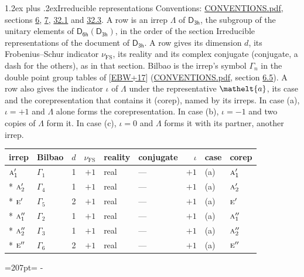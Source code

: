\documentclass[10pt,a4paper]{article}
\makeatletter
\renewcommand\section{\@startsection{section}{1}{\z@}{-3ex plus -1ex minus -.2ex}%
  {1.2ex plus .2ex}{\normalfont\large\sffamily\bfseries\color{parttitle}}}
\newcommand{\needspace}[1]{\par\penalty-100\begingroup\dimen0=#1\relax\dimen2=\pagegoal
  \advance\dimen2-\pagetotal\ifdim\dimen0>\dimen2\relax\ifdim\dimen2>0pt\vfil\break\fi\fi
  \endgroup}
\numberwithin{equation}{section}
\newcommand{\eltfont}[1]{{\let\sigma\eltsigma\mathelt{#1}}}
\newcommand{\grp}[1]{\mathsf{#1}}
\newcommand{\irr}[1]{\text{\normalfont\scshape #1}}
\newcommand{\elt}[1]{\eltfont{#1}}
\newcommand{\fsind}{\nu_{\mathrm{FS}}}
\makeatother
\begin{document}
\section{Irreducible representations}\label{s:irreps}
Conventions: \href{../../CONVENTIONS.pdf}{CONVENTIONS.pdf}, sections \href{../../../rotation/CONVENTIONS.pdf\#conv.6}{6}, \href{../../../rotation/CONVENTIONS.pdf\#conv.7}{7}, \href{../../CONVENTIONS.pdf\#conv.32.1}{32.1} and \href{../../CONVENTIONS.pdf\#conv.32.3}{32.3}.
\leavevmode\label{n:irrep.Delta}A row is an irrep $\Lambda$ of $\grp{D_{3h}}$, the subgroup of the unitary elements of $\grp{D_{6h}}(\grp{D_{3h}})$, in the order of the section Irreducible representations of the document of \href{../../../rotation/data/pdf/D3h.pdf}{$\grp{D_{3h}}$}. \label{n:index.dimension}\label{n:index.frobenius}\label{n:head.irrep}\label{n:head.reality}\label{n:head.conjugate}A row gives its dimension $d$, its Frobenius--Schur indicator $\fsind$, its reality and its complex conjugate (conjugate, a dash for the others), as in that section. \label{n:head.bilbao}\label{n:irrep.alias.gamma}Bilbao is the irrep's symbol $\Gamma_n$ in the double point group tables of [\href{../../../REFERENCES.pdf\#ref.EBW+17}{EBW+17}] (\href{../../CONVENTIONS.pdf}{CONVENTIONS.pdf}, section \href{../../../rotation/CONVENTIONS.pdf\#conv.6.5}{6.5}). \label{n:head.case.corep}\label{n:head.corep}A row also gives the indicator $\iota$ of $\Lambda$ under the representative $\elt{a}$, its case and the corepresentation that contains it (corep), named by its irreps. In case (a), $\iota = +1$ and $\Lambda$ alone forms the corepresentation. In case (b), $\iota = -1$ and two copies of $\Lambda$ form it. In case (c), $\iota = 0$ and $\Lambda$ forms it with its partner, another irrep.
\setlength{\emergencystretch}{2em}\par\setlength{\emergencystretch}{0pt}
{\small\renewcommand{\arraystretch}{1.25}\setlength{\tabcolsep}{4pt}\begin{longtable}{@{}llrrllrll@{}}\toprule
irrep & Bilbao & $d$ & $\fsind$ & reality & conjugate & $\iota$ & case & corep\\\midrule\endhead
\bottomrule\endfoot\endlastfoot
$\irr{a}_{1}'$ & $\Gamma_{1}$ & 1 & $+1$ & real & --- & $+1$ & (a) & $\irr{a}_{1}'$\\*
$\irr{a}_{2}'$ & $\Gamma_{4}$ & 1 & $+1$ & real & --- & $+1$ & (a) & $\irr{a}_{2}'$\\*
$\irr{e}'$ & $\Gamma_{5}$ & 2 & $+1$ & real & --- & $+1$ & (a) & $\irr{e}'$\\*
$\irr{a}_{1}''$ & $\Gamma_{2}$ & 1 & $+1$ & real & --- & $+1$ & (a) & $\irr{a}_{1}''$\\*
$\irr{a}_{2}''$ & $\Gamma_{3}$ & 1 & $+1$ & real & --- & $+1$ & (a) & $\irr{a}_{2}''$\\*
$\irr{e}''$ & $\Gamma_{6}$ & 2 & $+1$ & real & --- & $+1$ & (a) & $\irr{e}''$\\
\bottomrule\end{longtable}}
\needspace{207pt}
\end{document}
